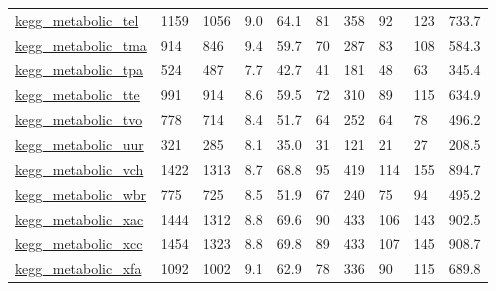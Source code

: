\begin{longtable}{llllllllll}
 \href{http://santafe.edu/~aaronc/data/kegg2006_metabolic.zip}{kegg\_metabolic\_tel}                                          & 1159       & 1056  & 9.0    & 64.1   & 81    & 358    & 92     & 123    & 733.7   \\
 \href{http://santafe.edu/~aaronc/data/kegg2006_metabolic.zip}{kegg\_metabolic\_tma}                                          & 914        & 846   & 9.4    & 59.7   & 70    & 287    & 83     & 108    & 584.3   \\
 \href{http://santafe.edu/~aaronc/data/kegg2006_metabolic.zip}{kegg\_metabolic\_tpa}                                          & 524        & 487   & 7.7    & 42.7   & 41    & 181    & 48     & 63     & 345.4   \\
 \href{http://santafe.edu/~aaronc/data/kegg2006_metabolic.zip}{kegg\_metabolic\_tte}                                          & 991        & 914   & 8.6    & 59.5   & 72    & 310    & 89     & 115    & 634.9   \\
 \href{http://santafe.edu/~aaronc/data/kegg2006_metabolic.zip}{kegg\_metabolic\_tvo}                                          & 778        & 714   & 8.4    & 51.7   & 64    & 252    & 64     & 78     & 496.2   \\
 \href{http://santafe.edu/~aaronc/data/kegg2006_metabolic.zip}{kegg\_metabolic\_uur}                                          & 321        & 285   & 8.1    & 35.0   & 31    & 121    & 21     & 27     & 208.5   \\
 \href{http://santafe.edu/~aaronc/data/kegg2006_metabolic.zip}{kegg\_metabolic\_vch}                                          & 1422       & 1313  & 8.7    & 68.8   & 95    & 419    & 114    & 155    & 894.7   \\
 \href{http://santafe.edu/~aaronc/data/kegg2006_metabolic.zip}{kegg\_metabolic\_wbr}                                          & 775        & 725   & 8.5    & 51.9   & 67    & 240    & 75     & 94     & 495.2   \\
 \href{http://santafe.edu/~aaronc/data/kegg2006_metabolic.zip}{kegg\_metabolic\_xac}                                          & 1444       & 1312  & 8.8    & 69.6   & 90    & 433    & 106    & 143    & 902.5   \\
 \href{http://santafe.edu/~aaronc/data/kegg2006_metabolic.zip}{kegg\_metabolic\_xcc}                                          & 1454       & 1323  & 8.8    & 69.8   & 89    & 433    & 107    & 145    & 908.7   \\
 \href{http://santafe.edu/~aaronc/data/kegg2006_metabolic.zip}{kegg\_metabolic\_xfa}                                          & 1092       & 1002  & 9.1    & 62.9   & 78    & 336    & 90     & 115    & 689.8   \\

\end{longtable}
